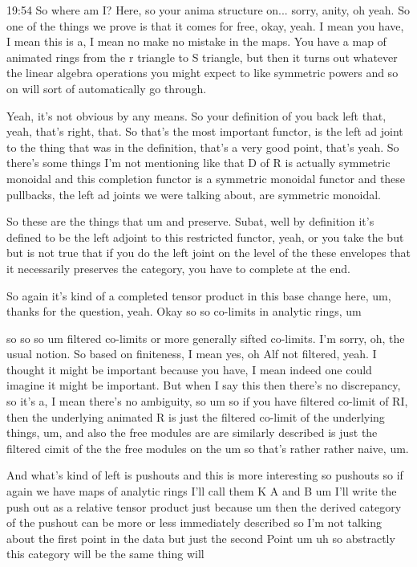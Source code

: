 \begin{unfinished}{19:54}
So where am I? Here, so your anima structure on... sorry, anity, oh yeah. So one of the things we prove is that it comes for free, okay, yeah. I mean you have, I mean this is a, I mean no make no mistake in the maps. You have a map of animated rings from the r triangle to S triangle, but then it turns out whatever the linear algebra operations you might expect to like symmetric powers and so on will sort of automatically go through. 

Yeah, it's not obvious by any means. So your definition of you back left that, yeah, that's right, that. So that's the most important functor, is the left ad joint to the thing that was in the definition, that's a very good point, that's yeah. So there's some things I'm not mentioning like that D of R is actually symmetric monoidal and this completion functor is a symmetric monoidal functor and these pullbacks, the left ad joints we were talking about, are symmetric monoidal. 

So these are the things that um and preserve. Subat, well by definition it's defined to be the left adjoint to this restricted functor, yeah, or you take the but but is not true that if you do the left joint on the level of the these envelopes that it necessarily preserves the category, you have to complete at the end. 

So again it's kind of a completed tensor product in this base change here, um, thanks for the question, yeah. Okay so so co-limits in analytic rings, um

 so so so um filtered co-limits or more generally sifted co-limits. I'm sorry, oh, the usual notion. So based on finiteness, I mean yes, oh Alf not filtered, yeah. I thought it might be important because you have, I mean indeed one could imagine it might be important. But when I say this then there's no discrepancy, so it's a, I mean there's no ambiguity, so um so if you have filtered co-limit of RI, then the underlying animated R is just the filtered co-limit of the underlying things, um, and also the free modules are are similarly described is just the filtered cimit of the the free modules on the um so that's rather rather naive, um. 

And what's kind of left is pushouts and this is more interesting so pushouts so if again we have maps of analytic rings I'll call them K A and B um I'll write the push out as a relative tensor product just because um then the derived category of the pushout can be more or less immediately described so I'm not talking about the first point in the data but just the second Point um uh so abstractly this category will be the same thing will


\end{unfinished}
